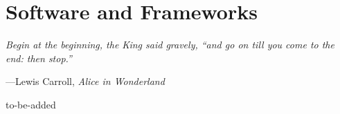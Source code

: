 \chapter{Software and Frameworks}
\label{chapter_software_frameworks}
\setlength{\epigraphwidth}{0.8\textwidth}
\setlength\epigraphrule{0pt}
\epigraph{\itshape Begin at the beginning, the King said gravely, ``and go on till you come to the end: then stop.''}{---Lewis Carroll, \textit{Alice in Wonderland}}

to-be-added